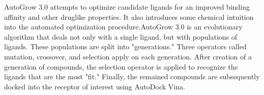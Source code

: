 AutoGrow 3.0 attempts to optimize candidate ligands for an improved binding affinity and other druglike properties. It also introduces some chemical intuition into the automated optimization procedure.AutoGrow 3.0 is an evolutionary algorithm that deals not only with a single ligand, but with populations of ligands. These populations are split into "generations." Three operators called mutation, crossover, and selection apply on each generation. After creation of a generation of compounds, the selection operator is applied to recognize the ligands that are the most "fit." Finally, the remained compounds are subsequently docked into the receptor of interest using AutoDock Vina. 